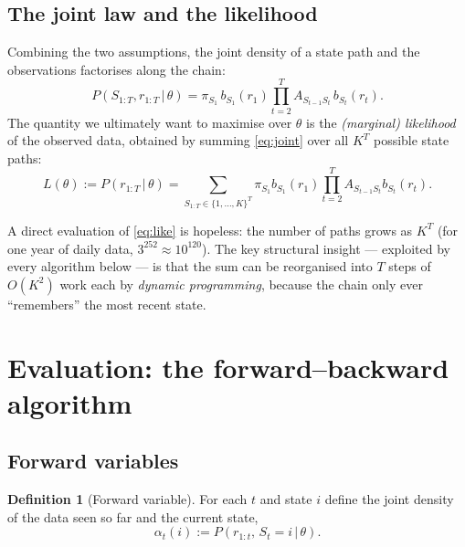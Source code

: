 \documentclass[11pt]{article}
\newcommand{\given}{\,\vert\,}
\newcommand{\eqdef}{:=}
\newcommand{\state}{S}
\newcommand{\obs}{r}
\newcommand{\nstate}{K}
\newcommand{\fwd}{\alpha}
\theoremstyle{plain}
\theoremstyle{definition}
\newtheorem{definition}{Definition}
\theoremstyle{remark}
\begin{document}
\subsection{The joint law and the likelihood}

Combining the two assumptions, the joint density of a state path and the
observations factorises along the chain:
\begin{equation}\label{eq:joint}
  P(\state_{1:T},\obs_{1:T}\given\theta)
  = \pi_{\state_1}\, b_{\state_1}(\obs_1)
    \prod_{t=2}^{T} A_{\state_{t-1}\state_t}\, b_{\state_t}(\obs_t).
\end{equation}
The quantity we ultimately want to maximise over $\theta$ is the
\emph{(marginal) likelihood} of the observed data, obtained by summing
\eqref{eq:joint} over all $\nstate^{T}$ possible state paths:
\begin{equation}\label{eq:like}
  L(\theta) \eqdef P(\obs_{1:T}\given\theta)
  = \sum_{\state_{1:T}\in\{1,\dots,\nstate\}^T}
    \pi_{\state_1} b_{\state_1}(\obs_1)
    \prod_{t=2}^{T} A_{\state_{t-1}\state_t} b_{\state_t}(\obs_t).
\end{equation}

A direct evaluation of \eqref{eq:like} is hopeless: the number of paths grows as
$\nstate^{T}$ (for one year of daily data, $3^{252}\approx 10^{120}$). The key
structural insight --- exploited by every algorithm below --- is that the
sum can be reorganised into $T$ steps of $O(\nstate^2)$ work each by
\emph{dynamic programming}, because the chain only ever ``remembers'' the most
recent state.

\section{Evaluation: the forward--backward algorithm}\label{sec:fb}

\subsection{Forward variables}

\begin{definition}[Forward variable]
For each $t$ and state $i$ define the joint density of the data seen so far and
the current state,
\begin{equation}
  \fwd_t(i) \eqdef P(\obs_{1:t},\, \state_t=i \given \theta).
\end{equation}
\end{definition}
\end{document}
